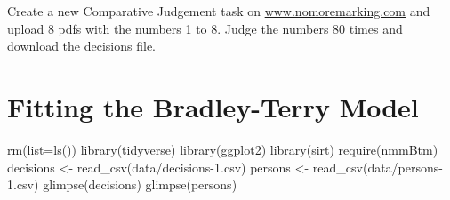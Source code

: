 \documentclass[
  letterpaper,
  DIV=11,
  numbers=noendperiod]{scrreprt}
\newenvironment{Shaded}{\begin{snugshade}}{\end{snugshade}}
\newcommand{\AttributeTok}[1]{\textcolor[rgb]{0.40,0.45,0.13}{#1}}
\newcommand{\FunctionTok}[1]{\textcolor[rgb]{0.28,0.35,0.67}{#1}}
\newcommand{\NormalTok}[1]{\textcolor[rgb]{0.00,0.23,0.31}{#1}}
\newcommand{\OtherTok}[1]{\textcolor[rgb]{0.00,0.23,0.31}{#1}}
\newcommand{\StringTok}[1]{\textcolor[rgb]{0.13,0.47,0.30}{#1}}
\begin{document}
Create a new Comparative Judgement task on \url{www.nomoremarking.com}
and upload 8 pdfs with the numbers 1 to 8. Judge the numbers 80 times
and download the decisions file.

\hypertarget{fitting-the-bradley-terry-model}{%
\section{Fitting the Bradley-Terry
Model}\label{fitting-the-bradley-terry-model}}

\begin{Shaded}
\begin{Highlighting}[]
\FunctionTok{rm}\NormalTok{(}\AttributeTok{list=}\FunctionTok{ls}\NormalTok{())}
\FunctionTok{library}\NormalTok{(tidyverse)}
\FunctionTok{library}\NormalTok{(ggplot2)}
\FunctionTok{library}\NormalTok{(sirt)}
\FunctionTok{require}\NormalTok{(nmmBtm)}
\NormalTok{decisions }\OtherTok{\textless{}{-}} \FunctionTok{read\_csv}\NormalTok{(}\StringTok{\textquotesingle{}data/decisions{-}1.csv\textquotesingle{}}\NormalTok{)}
\NormalTok{persons }\OtherTok{\textless{}{-}} \FunctionTok{read\_csv}\NormalTok{(}\StringTok{\textquotesingle{}data/persons{-}1.csv\textquotesingle{}}\NormalTok{)}
\FunctionTok{glimpse}\NormalTok{(decisions)}
\FunctionTok{glimpse}\NormalTok{(persons)}
\end{Highlighting}
\end{Shaded}
\end{document}
